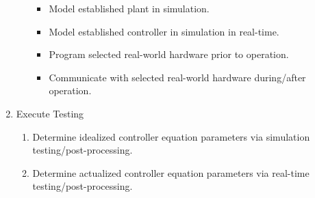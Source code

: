 \documentclass[crop=false,float=true,class=scrreprt]{standalone}
\begin{document}
\begin{enumerate}[leftmargin=*]
\begin{enumerate}[leftmargin=*]
  \begin{itemize}[leftmargin=*]                                                                        \vspace{-1em}

    \item Model established plant      in simulation.                                                  \vspace{-1em}
    \item Model established controller in simulation  in real-time.                           \vspace{-1em}
    \item Program selected real-world hardware prior to operation.                                     \vspace{-1em}
    \item Communicate with selected real-world hardware during/after operation.                       %
      
  \end{itemize}                                                                                        \vspace{-0.5em}

\end{enumerate}                                                                                        \vspace{-0.5em}

\item Execute Testing

\begin{enumerate}[leftmargin=*]                                                                        \vspace{-1em}

  \item Determine idealized  controller equation parameters via simulation testing/post-processing.    \vspace{-1em}
  \item Determine actualized controller equation parameters via real-time  testing/post-processing.   %
  
\end{enumerate}                                                                                        \vspace{-0.5em}

\end{enumerate}
\end{document}
